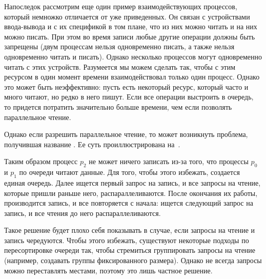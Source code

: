 Напоследок рассмотрим еще один пример взаимодействующих процессов, который
немножко отличается от уже приведенных. Он связан с устройствами ввода-вывода и
с их спецификой в том плане, что из них можно читать и на них можно писать. При
этом во время записи любые другие операции должны быть запрещены (двум процессам
нельзя одновременно писать, а также нельзя одновременно читать и писать). Однако
несколько процессов могут одновременно читать с этих устройств. Разумеется мы
можем сделать так, чтобы с этим ресурсом в один момент времени взаимодействовал
только один процесс. Однако это может быть неэффективно: пусть есть некоторый
ресурс, который часто и много читают, но редко в него пишут. Если все операции
выстроить в очередь, то придется потратить значительно больше времени, чем если
позволять параллельное чтение.

Однако если разрешить параллельное чтение, то может возникнуть проблема,
получившая название . Ее суть
проиллюстрирована на~.


Таким образом процесс \(p_2\) не может ничего записать из-за того, что процессы
\(p_0\) и \(p_1\) по очереди читают данные. Для того, чтобы этого избежать,
создается единая очередь. Далее ищется первый запрос на запись, и все запросы на
чтение, которые пришли раньше него, распараллеливаются. После окончания их
работы, производится запись, и все повторяется с начала: ищется следующий запрос
на запись, и все чтения до него распараллеливаются.

Такое решение будет плохо себя показывать в случае, если запросы на чтение и
запись чередуются. Чтобы этого избежать, существуют некоторые подходы по
пересортировке очереди так, чтобы стремиться группировать запросы на чтение
(например, создавать группы фиксированного размера). Однако не всегда запросы
можно переставлять местами, поэтому это лишь частное решение.

